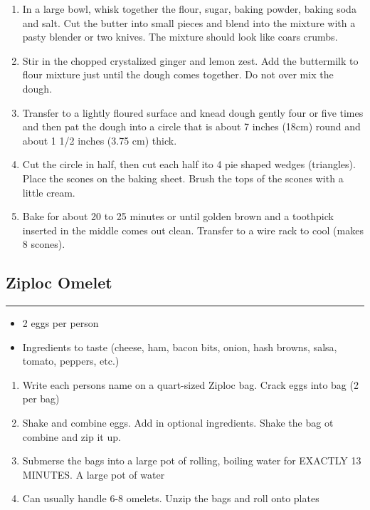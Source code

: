 \documentclass{article}
\begin{document}
\begin{enumerate}
    \item 
        In a large bowl, whisk together the flour, sugar, baking powder, baking soda and salt. Cut the butter into small pieces and blend into the mixture with a pasty blender or two knives. The mixture should look like coars crumbs.
    \item 
        Stir in the chopped crystalized ginger and lemon zest. Add the buttermilk to flour mixture just until the dough comes together. Do not over mix the dough.
    \item
        Transfer to a lightly floured surface and knead dough gently four or five times and then pat the dough into a circle that is about 7 inches (18cm) round and about 1 1/2 inches (3.75 cm) thick. 
    \item
        Cut the circle in half, then cut each half ito 4 pie shaped wedges (triangles). Place the scones on the baking sheet. Brush the tops of the scones with a little cream.
    \item
        Bake for about 20 to 25 minutes or until golden brown and a toothpick inserted in the middle comes out clean. Transfer to a wire rack to cool (makes 8 scones).
\end{enumerate}
\newpage

\subsection{Ziploc Omelet} 
\noindent\rule[0.5ex]{\linewidth}{1pt}

\begin{framed}
    \begin{itemize}
        \item 2 eggs per person 
        \item Ingredients to taste (cheese, ham, bacon bits, onion, hash browns, salsa, tomato, peppers, etc.)
    \end{itemize}
\end{framed}

\begin{enumerate}
    \item
        Write each persons name on a quart-sized Ziploc bag. Crack eggs into bag (2 per bag)
    \item
        Shake and combine eggs. Add in optional ingredients. Shake the bag ot combine and zip it up.
    \item 
        Submerse the bags into a large pot of rolling, boiling water for EXACTLY 13 MINUTES. A large pot of water
    \item
        Can usually handle 6-8 omelets. Unzip the bags and roll onto plates
\end{enumerate}
\newpage
\end{document}
